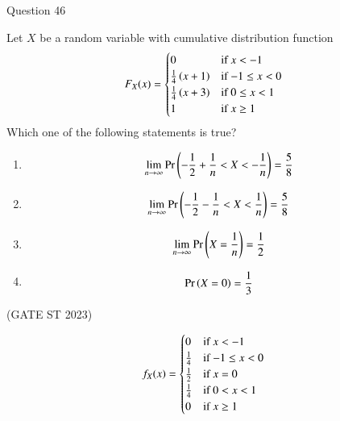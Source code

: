 \documentclass[journal,12pt,twocolumn]{IEEEtran}
\theoremstyle{remark}
\begin{document}
Question 46

Let $X$ be a random variable with cumulative distribution function
\begin{align}
F_X(x) &= 
	\begin{cases}
		0 & \text{if $x < -1$}\\
		\frac{1}{4}\left(x+1\right) & \text{if $-1 \leq x < 0$}\\
		\frac{1}{4}\left(x+3\right) & \text{if $0 \leq x < 1$}\\
		1 & \text{if $ x \geq 1$}\\
	\end{cases}
\end{align}
Which one of the following statements is true?
\begin{enumerate}[label=(\Alph*)]
    \item\begin{align} \lim_{n \to \infty} \Pr\left(-\frac{1}{2} + \frac{1}{n} < X < -\frac{1}{n}\right) = \frac{5}{8}\end{align}
    \item \begin{align}\lim_{n \to \infty} \Pr\left(-\frac{1}{2} - \frac{1}{n} < X < \frac{1}{n}\right) = \frac{5}{8}\end{align}
    \item \begin{align}\lim_{n \to \infty} \Pr\left(X = \frac{1}{n}\right) = \frac{1}{2}\end{align}
    \item \begin{align}\Pr\left(X = 0\right) = \frac{1}{3}\end{align}
\end{enumerate}

\hfill(GATE ST 2023)

\solution
\begin{align}
	f_X(x) &= 
		\begin{cases}
			0 & \text{if $x < -1$}\\
			\frac{1}{4} & \text{if $-1 \leq x < 0$}\\
			\frac{1}{2} & \text{if $x = 0$}\\
			\frac{1}{4} & \text{if $0 < x < 1$}\\
			0 & \text{if $ x \geq 1$}\\
		\end{cases} \label{eq:pdf_X}
\end{align}
\end{document}
